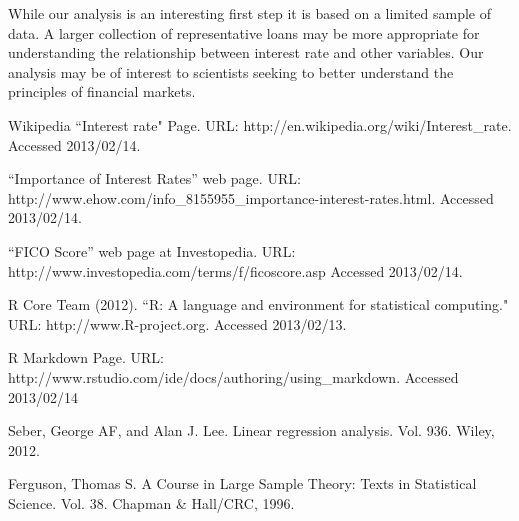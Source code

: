 \documentclass[a4paper,12pt]{extarticle}
\begin{document}
While our analysis is an interesting first step it is based on a limited sample of data. A larger collection of representative loans may be more appropriate for understanding the relationship between interest rate and other variables. Our analysis may be of interest to scientists seeking to better understand the principles of financial markets.

\newpage


\begin{thebibliography}{9}

 Wikipedia ``Interest rate" Page. URL:
  http://en.wikipedia.org/wiki/Interest\_rate. Accessed 2013/02/14.

  ``Importance of Interest Rates'' web page. URL:
  http://www.ehow.com/info\_8155955\_importance-interest-rates.html.
  Accessed 2013/02/14.

  ``FICO Score'' web page at Investopedia. URL:
  http://www.investopedia.com/terms/f/ficoscore.asp
  Accessed 2013/02/14.

  R Core Team (2012). ``R: A language and environment for statistical computing." URL: http://www.R-project.org. Accessed 2013/02/13.

  R Markdown Page. URL: http://www.rstudio.com/ide/docs/authoring/using\_markdown. Accessed 2013/02/14

  Seber, George AF, and Alan J. Lee. Linear regression analysis. Vol. 936. Wiley, 2012.

  Ferguson, Thomas S. A Course in Large Sample Theory: Texts in Statistical Science. Vol. 38. Chapman \& Hall/CRC, 1996.
\end{thebibliography}
\end{document}

